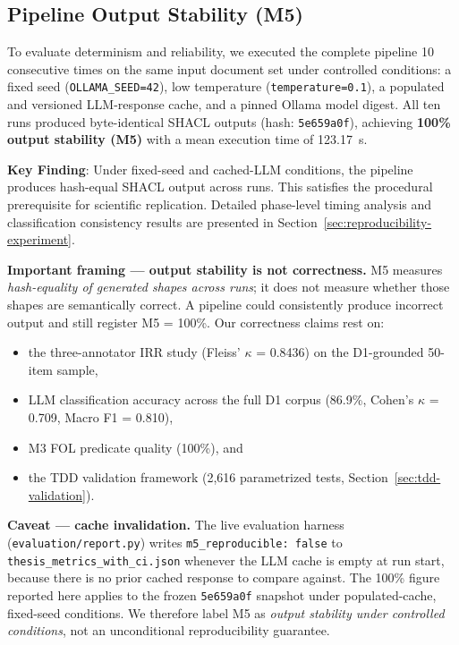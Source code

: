 \subsection{Pipeline Output Stability (M5)}
\label{sec:reproducibility-summary}

To evaluate determinism and reliability, we executed the complete pipeline 10 consecutive times on the same input document set under controlled conditions: a fixed seed (\texttt{OLLAMA\_SEED=42}), low temperature (\texttt{temperature=0.1}), a populated and versioned LLM-response cache, and a pinned Ollama model digest. All ten runs produced byte-identical SHACL outputs (hash: \texttt{5e659a0f}), achieving \textbf{100\% output stability (M5)} with a mean execution time of 123.17~s.

\textbf{Key Finding}: Under fixed-seed and cached-LLM conditions, the pipeline produces hash-equal SHACL output across runs. This satisfies the procedural prerequisite for scientific replication. Detailed phase-level timing analysis and classification consistency results are presented in Section~\ref{sec:reproducibility-experiment}.

\textbf{Important framing --- output stability is not correctness.} M5 measures \textit{hash-equality of generated shapes across runs}; it does not measure whether those shapes are semantically correct. A pipeline could consistently produce incorrect output and still register M5 = 100\%. Our correctness claims rest on:

\begin{itemize}
    \item the three-annotator IRR study (Fleiss' $\kappa$ = 0.8436) on the D1-grounded 50-item sample,
    \item LLM classification accuracy across the full D1 corpus (86.9\%, Cohen's $\kappa$ = 0.709, Macro F1 = 0.810),
    \item M3 FOL predicate quality (100\%), and
    \item the TDD validation framework (2,616 parametrized tests, Section~\ref{sec:tdd-validation}).
\end{itemize}

\textbf{Caveat --- cache invalidation.} The live evaluation harness (\texttt{evaluation/report.py}) writes \texttt{m5\_reproducible: false} to \texttt{thesis\_metrics\_with\_ci.json} whenever the LLM cache is empty at run start, because there is no prior cached response to compare against. The 100\% figure reported here applies to the frozen \texttt{5e659a0f} snapshot under populated-cache, fixed-seed conditions. We therefore label M5 as \textit{output stability under controlled conditions}, not an unconditional reproducibility guarantee.


